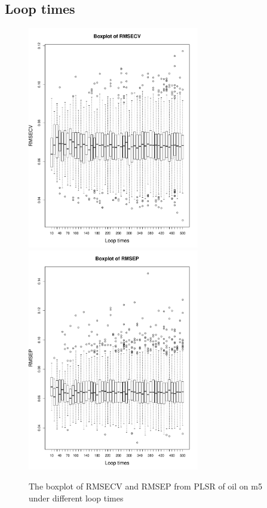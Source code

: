 \documentclass[a4paper,12pt,titlepage]{article} %
\numberwithin{equation}{section}  %
\begin{document}
	\subsection{Loop times}
	\label{sec:Loop times}

	
	\begin{figure}[h]    %
		\centering           %
		\includegraphics[width=7.5cm, angle=0]{boxplot_RMSECV_loop_times_500.pdf}  %
		\includegraphics[width=7.5cm, angle=0]{boxplot_RMSEP_loop_times_500.pdf} %
		\vspace*{-0.25cm}    %
		\caption{The boxplot of RMSECV and RMSEP from PLSR of oil on m5 under different loop times}          %
		\label{fig:sd_RMSECV_RMSEP}               %
	\end{figure}                        %
	
\end{document}
